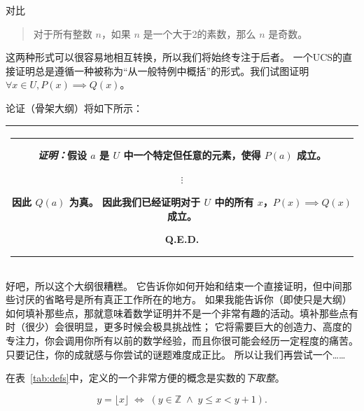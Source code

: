 对比

\begin{quote} 
      对于所有整数 $n$，如果 $n$ 是一个大于2的素数，那么 $n$ 是奇数。
\end{quote}

这两种形式可以很容易地相互转换，所以我们将始终专注于后者。
一个UCS的直接证明总是遵循一种被称为“从一般特例中概括”的形式。我们试图证明 $\forall x \in U, P(x) \implies Q(x)$。

论证（骨架大纲）将如下所示：
\medskip

\begin{center}
      \begin{tabular}{|c|} \hline
            \rule{16pt}{0pt}\begin{minipage}{.75\textwidth}
                                  \rule{0pt}{20pt} 
                                        {\em 证明：}假设 $a$ 是 $U$ 中一个特定但任意的元素，使得 $P(a)$ 成立。
                                  \begin{center}
                        $\vdots$
                  \end{center}

                                  
                                  因此 $Q(a)$ 为真。\newline
                                  因此我们已经证明对于 $U$ 中的所有 $x$，$P(x) \implies Q(x)$ 成立。\newline
                                  \rule{0pt}{0pt} \hspace{\fill} Q.E.D.
                                  \rule[-10pt]{0pt}{16pt}
                            \end{minipage} \rule{16pt}{0pt} \\ \hline
      \end{tabular}
\end{center}
\medskip

好吧，所以这个大纲很糟糕。
它告诉你如何开始和结束一个直接证明，但中间那些讨厌的省略号是所有真正工作所在的地方。
如果我能告诉你（即使只是大纲）如何填补那些点，那就意味着数学证明并不是一个非常有趣的活动。填补那些点有时（很少）会很明显，更多时候会极具挑战性；
它将需要巨大的创造力、高度的专注力，你会调用你所有以前的数学经验，而且你很可能会经历一定程度的痛苦。
只要记住，你的成就感与你尝试的谜题难度成正比。
所以让我们再尝试一个……

在表~\ref{tab:defs}中，定义的一个非常方便的概念是实数的\emph{下取整}。

\[ y = \lfloor x \rfloor \; \iff \; (y \in \mathbb Z \; \land \; y \leq x < y+1).\]

